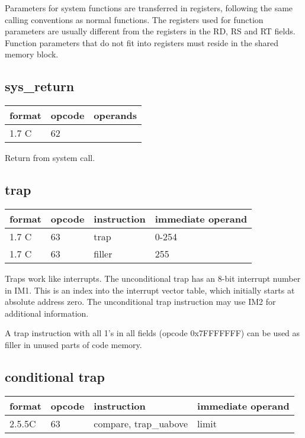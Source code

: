 \documentclass[forwardcom.tex]{subfiles}
\begin{document}
Parameters for system functions are transferred in registers, following the same calling conventions as normal functions. The registers used for function parameters are usually different from the registers in the RD, RS and RT fields. Function parameters that do not fit into registers must reside in the shared memory block.


\subsection{sys\_return}
\label{table:sysReturnInstruction}
\begin{tabular}{|p{12mm}|p{15mm}|p{100mm}|}
\hline
\bfseries format & \bfseries opcode & \bfseries operands \\ \hline
1.7 C & 62 & \\ \hline
\end{tabular}
\vv

Return from system call.

\subsection{trap}
\label{traps}
\label{table:trapInstruction}
\begin{tabular}{|p{12mm}|p{12mm}|p{30mm}|p{80mm}|}
\hline
\bfseries format & \bfseries opcode & \bfseries instruction & \bfseries immediate operand \\ \hline
1.7 C & 63 & trap & 0-254 \\ \hline
1.7 C & 63 & filler & 255 \\ \hline
\end{tabular}
\vv

Traps work like interrupts. The unconditional trap has an 8-bit interrupt number in IM1. This is an index into the interrupt vector table, which initially starts at absolute address zero. The unconditional trap instruction may use IM2 for additional information.  
\vv

A trap instruction with all 1's in all fields (opcode 0x7FFFFFFF) can be used as filler in unused parts of code memory.

\subsection{conditional trap}
\label{table:conditionalTrapInstructions}
\begin{tabular}{|p{12mm}|p{12mm}|p{30mm}|p{80mm}|}
\hline
\bfseries format & \bfseries opcode & \bfseries instruction & \bfseries immediate operand \\ \hline
2.5.5C & 63 & compare, trap\_uabove & limit \\ \hline
\end{tabular}
\vv
\end{document}
